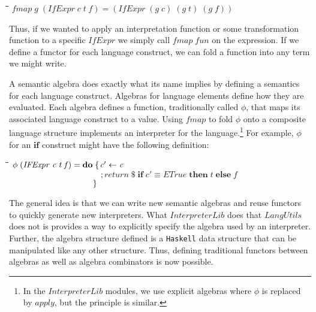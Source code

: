 \documentclass[10pt]{article}
\newlength{\lwidth}\setlength{\lwidth}{4.5cm}
\newlength{\cwidth}\setlength{\cwidth}{8mm} %
\newcommand{\Conid}[1]{\mathit{#1}}
\newcommand{\Varid}[1]{\mathit{#1}}
\begin{document}
\begin{tabbing}
\qquad\=\hspace{\lwidth}\=\hspace{\cwidth}\=\+\kill
${\Varid{fmap}\;\Varid{g}\;(\Conid{IfExpr}\;\Varid{c}\;\Varid{t}\;\Varid{f})\mathrel{=}(\Conid{IfExpr}\;(\Varid{g}\;\Varid{c})\;(\Varid{g}\;\Varid{t})\;(\Varid{g}\;\Varid{f}))}$
\end{tabbing}
Thus, if we wanted to apply an interpretation function or some
transformation function to a specific \ensuremath{\Conid{IfExpr}} we simply call \ensuremath{\Varid{fmap}\;\Varid{fun}}
on the expression.  If we define a functor for each language
construct, we can fold a function into any term we might write.

A semantic algebra does exactly what its name implies by defining a
semantics for each language construct.  Algebras for language elements
define how they are evaluated.  Each algebra defines a function,
traditionally called \ensuremath{\Varid{\phi}}, that maps its associated language construct
to a value.  Using \ensuremath{\Varid{fmap}} to fold \ensuremath{\Varid{\phi}} onto a composite language
structure implements an interpreter for the language.\footnote{In the
  \ensuremath{\Conid{InterpreterLib}} modules, we use explicit algebras where \ensuremath{\Varid{\phi}} is
  replaced by \ensuremath{\Varid{apply}}, but the principle is similar.}
For example, \ensuremath{\Varid{\phi}} for an \ensuremath{\mathbf{if}} construct might have the following
definition:

\begin{tabbing}
\qquad\=\hspace{\lwidth}\=\hspace{\cwidth}\=\+\kill
${\Varid{\phi}\;(\Conid{IFExpr}\;\Varid{c}\;\Varid{t}\;\Varid{f})\mathrel{=}\mathbf{do}\;\{\mskip1.5mu \Varid{c'}\leftarrow \Varid{c}}$\\
${\phantom{\Varid{\phi}\;(\Conid{IFExpr}\;\Varid{c}\;\Varid{t}\;\Varid{f})\mathrel{=}\mathbf{do}\;\mbox{}};\Varid{return}\mathbin{\$}\mathbf{if}\;\Varid{c'}\equiv \Conid{ETrue}\;\mathbf{then}\;\Varid{t}\;\mathbf{else}\;\Varid{f}}$\\
${\phantom{\Varid{\phi}\;(\Conid{IFExpr}\;\Varid{c}\;\Varid{t}\;\Varid{f})\mathrel{=}\mathbf{do}\;\mbox{}}\mskip1.5mu\}}$
\end{tabbing}
The general idea is that we can write new semantic algebras and reuse
functors to quickly generate new interpreters.  What \ensuremath{\Conid{InterpreterLib}}
does that \ensuremath{\Conid{LangUtils}} does not is provides a way to explicitly specify
the algebra used by an interpreter.  Further, the algebra structure
defined is a \texttt{Haskell} data structure that can be manipulated
like any other structure.  Thus, defining traditional functors between
algebras as well as algebra combinators is now possible.
\end{document}
